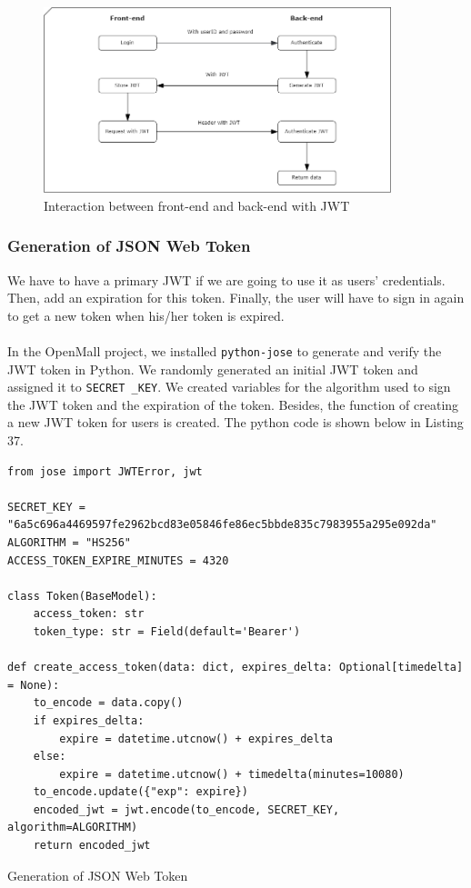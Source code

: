 \documentclass{article}
\begin{document}
\begin{figure}[!htp]
    \centering
    \includegraphics[width=0.9\textwidth]{JWT.png}
    \caption{\label{fig:JWT}Interaction between front-end and back-end with JWT}
\end{figure}

\subsubsection{Generation of JSON Web Token}

We have to have a primary JWT if we are going to use it as users’ credentials. Then, add an expiration for this token. Finally, the user will have to sign in again to get a new token when his/her token is expired.  
\\\\
In the OpenMall project, we installed \verb|python-jose| to generate and verify the JWT token in Python. We randomly generated an initial JWT token and assigned it to \verb|SECRET _KEY|. We created variables for the algorithm used to sign the JWT token and the expiration of the token. Besides, the function of creating a new JWT token for users is created. The python code is shown below in Listing 37.

\begin{listing}[!htp]
\begin{verbatim}
from jose import JWTError, jwt

SECRET_KEY = "6a5c696a4469597fe2962bcd83e05846fe86ec5bbde835c7983955a295e092da"
ALGORITHM = "HS256"
ACCESS_TOKEN_EXPIRE_MINUTES = 4320

class Token(BaseModel):
    access_token: str
    token_type: str = Field(default='Bearer')
	
def create_access_token(data: dict, expires_delta: Optional[timedelta] = None):
    to_encode = data.copy()
    if expires_delta:
        expire = datetime.utcnow() + expires_delta
    else:
        expire = datetime.utcnow() + timedelta(minutes=10080)
    to_encode.update({"exp": expire})
    encoded_jwt = jwt.encode(to_encode, SECRET_KEY, algorithm=ALGORITHM)
    return encoded_jwt

\end{verbatim}
\caption{Generation of JSON Web Token}
\label{JWT grneration}
\end{listing}
\end{document}
